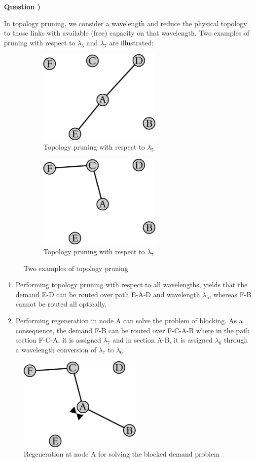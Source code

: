 \documentclass[10pt,letterpaper]{article}
\newcounter{QuestionNumber}
\newcommand{\Q}{
\textbf{Question \theQuestionNumber)}
\stepcounter{QuestionNumber}
}
\begin{document}
\newpage

\Q

In topology pruning, we consider a wavelength and reduce the physical topology to those links with available (free) capacity on that wavelength. Two examples of pruning with respect to $\lambda_5$ and $\lambda_7$ are illustrated:
\begin{figure}[h]
\begin{subfigure}{0.49\textwidth}
\centering
\includegraphics[width=60mm]{net-wa-5.eps}
\caption{
Topology pruning with respect to $\lambda_5$
}
\end{subfigure}
\begin{subfigure}{0.49\textwidth}
\centering
\includegraphics[width=60mm]{net-wa-7.eps}
\caption{
Topology pruning with respect to $\lambda_7$
}
\end{subfigure}
\caption{
Two examples of topology pruning
}
\end{figure}

\begin{enumerate}[label=\alph*-]
\item
Performing topology pruning with respect to all wavelengths, yields that the demand E-D can be routed over path E-A-D and wavelength $\lambda_5$, whereas F-B cannot be routed all optically.
\item
Performing regeneration in node A can solve the problem of blocking. As a consequence, the demand F-B can be routed over F-C-A-B where in the path section F-C-A, it is assigned $\lambda_7$ and in section A-B, it is assigned $\lambda_6$ through a wavelength conversion of $\lambda_7$ to $\lambda_6$.
\end{enumerate}
\begin{figure}[h]
\centering
\includegraphics[width=60mm]{net-wa-7-6.eps}
\caption{
Regeneration at node A for solving the blocked demand problem
}
\end{figure}
\end{document}
